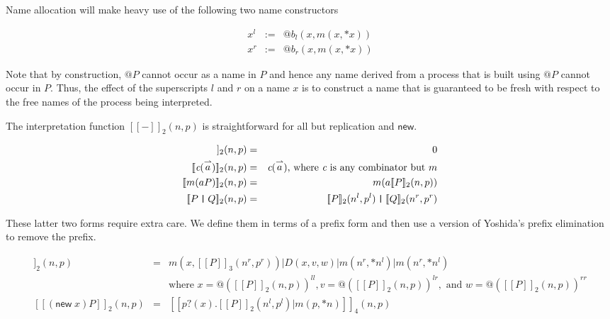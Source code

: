 \documentclass{llncs}
\makeatletter
\newcommand{\new}{\mathsf{new}}
\newcommand{\ldb}{[\![}
\newcommand{\rdb}{]\!]}
\newcommand{\id}[1]{\texttt{#1}}
\newcommand{\pzero}{\mathbin{0}}
\newcommand{\juxtap}{\mathbin{\id{|}}}
\newcommand{\binpar}[2]{#1 | #2}
\newcommand{\prefix}[3]{#1?(#2) . #3}
\newcommand{\quotep}[1]{\mathsf{@}#1}
\newcommand{\meaningof}[1]{\ldb #1 \rdb}
\newcommand{\vect}[1]{\stackrel{\rightharpoonup}{#1}}
\makeatother
\begin{document}
Name allocation will make heavy use of the following two name
constructors

\begin{eqnarray*}
  x^l & := & \quotep{b_{l}(x,m(x,*x))} \\
  x^r & := & \quotep{b_{r}(x,m(x,*x))}
\end{eqnarray*}

Note that by construction, $\quotep{P}$ cannot occur as a name in $P$
and hence any name derived from a process that is built using
$\quotep{P}$ cannot occur in $P$. Thus, the effect of the superscripts
$l$ and $r$ on a name $x$ is to construct a name that is guaranteed to
be fresh with respect to the free names of the process being interpreted.

The interpretation function $\meaningof{-}_2(n, p)$ is straightforward
for all but replication and $\mathsf{new}$.

\begin{eqnarray*}
    \meaningof{\pzero}_2 (n,p)
      & = &
       \pzero \\
    \meaningof{\emph{c}(\vect{a})}_2 (n,p) 
      & = & 
      \emph{c}(\vect{a})\mbox{, where $\emph{c}$ is any combinator but $m$} \\
    \meaningof{m(aP)}_2 (n,p) 
      & = & 
          m(a \meaningof{P}_2 (n,p)) \\
    \meaningof{P \juxtap Q}_2 (n,p) 
      & = & 
    \meaningof{P}_2 (n^l, p^l)
         \juxtap \meaningof{Q}_2 (n^r, p^r) \\ 
\end{eqnarray*}

These latter two forms require extra care. We define them in terms of
a prefix form and then use a version of Yoshida's prefix elimination
to remove the prefix.

\begin{eqnarray*}
    \meaningof{\id{!} P}_2 (n,p)
          & = & \binpar{m(x, \meaningof{P}_3(n^r,p^r))}
                  {\binpar{D(x,v,w)}
                    {\binpar{m(n^r, *n^l)}{m(n^r, *n^l)}}} \\
                  & & \mbox{where } 
                      x = @(\meaningof{P}_2(n,p))^{ll}, 
                      v = @(\meaningof{P}_2(n,p))^{lr}, \mbox{ and }
                      w = @(\meaningof{P}_2(n,p))^{rr} \\
    \meaningof{(\new \; x ) P}_2 (n, p) 
          & = & 
         \meaningof{\prefix{p}{x}{\binpar{\meaningof{P}_2 ( n^l, p^l )}{m(p, *n)}}}_4(n, p)
\end{eqnarray*}
\end{document}
